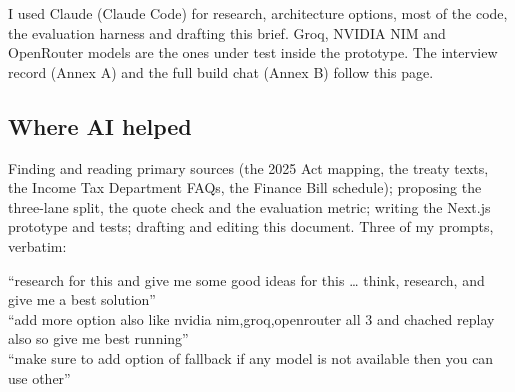 \documentclass[10pt,a4paper]{article}
\begin{document}
{\small\color{muted}I used Claude (Claude Code) for research, architecture options, most of the code, the evaluation harness and drafting this brief. Groq, NVIDIA NIM and OpenRouter models are the ones under test inside the prototype. The interview record (Annex A) and the full build chat (Annex B) follow this page.\par}

\subsection{Where AI helped}
Finding and reading primary sources (the 2025 Act mapping, the treaty texts, the Income Tax Department FAQs, the Finance Bill schedule); proposing the three-lane split, the quote check and the evaluation metric; writing the Next.js prototype and tests; drafting and editing this document. Three of my prompts, verbatim:
\begin{tcolorbox}[colback=aiwash,colframe=aiwash,arc=3pt,boxrule=0pt,left=7pt,right=7pt,top=4pt,bottom=4pt,borderline west={2.5pt}{0pt}{ai},fontupper=\itshape\small]
``research for this and give me some good ideas for this \dots{} think, research, and give me a best solution''\\[2pt]
``add more option also like nvidia nim,groq,openrouter all 3 and chached replay also so give me best running''\\[2pt]
``make sure to add option of fallback if any model is not available then you can use other''
\end{tcolorbox}
\end{document}
